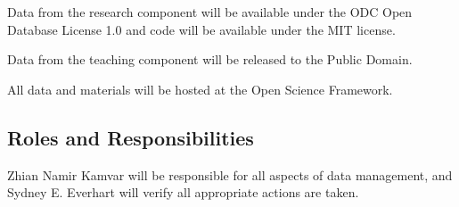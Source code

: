 \documentclass[12pt,letterpaper]{article}
\begin{document}
Data from the research component will be available under the ODC Open Database License 1.0 and code will be available under the MIT license. 

Data from the teaching component will be released to the Public Domain.

All data and materials will be hosted at the Open Science Framework.

\subsection{Roles and Responsibilities}

Zhian Namir Kamvar will be responsible for all aspects of data management, and Sydney E. Everhart will verify all appropriate actions are taken. 



\end{document}
